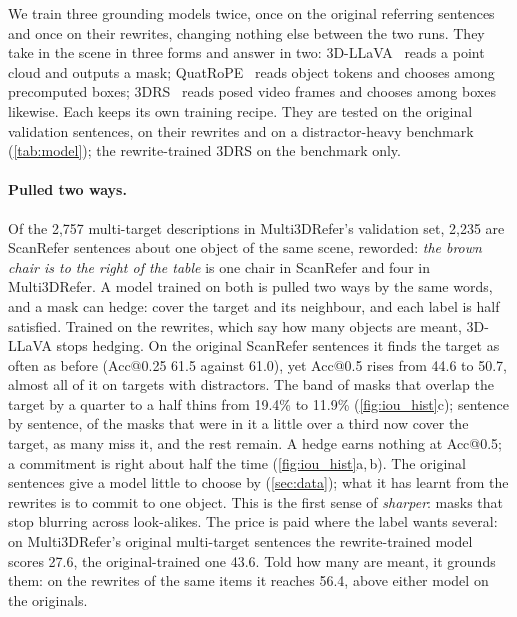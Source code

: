 We train three grounding models twice, once on the original referring sentences and once on their rewrites, changing nothing else between the two runs.
They take in the scene in three forms and answer in two: 3D-LLaVA~\cite{3dllava} reads a point cloud and outputs a mask; QuatRoPE~\cite{quatrope} reads object tokens and chooses among precomputed boxes; 3DRS~\cite{3drs} reads posed video frames and chooses among boxes likewise.
Each keeps its own training recipe.
They are tested on the original validation sentences, on their rewrites and on a distractor-heavy benchmark (\cref{tab:model}); the rewrite-trained 3DRS on the benchmark only.


\paragraph{Pulled two ways.}
Of the 2,757 multi-target descriptions in Multi3DRefer's validation set, 2,235 are ScanRefer sentences about one object of the same scene, reworded: \emph{the brown chair is to the right of the table} is one chair in ScanRefer and four in Multi3DRefer.
A model trained on both is pulled two ways by the same words, and a mask can hedge: cover the target and its neighbour, and each label is half satisfied.
Trained on the rewrites, which say how many objects are meant, 3D-LLaVA stops hedging.
On the original ScanRefer sentences it finds the target as often as before (Acc@0.25 61.5 against 61.0), yet Acc@0.5 rises from 44.6 to 50.7, almost all of it on targets with distractors.
The band of masks that overlap the target by a quarter to a half thins from 19.4\% to 11.9\% (\cref{fig:iou_hist}c); sentence by sentence, of the masks that were in it a little over a third now cover the target, as many miss it, and the rest remain.
A hedge earns nothing at Acc@0.5; a commitment is right about half the time (\cref{fig:iou_hist}a,\,b).
The original sentences give a model little to choose by (\cref{sec:data}); what it has learnt from the rewrites is to commit to one object.
This is the first sense of \emph{sharper}: masks that stop blurring across look-alikes.
The price is paid where the label wants several: on Multi3DRefer's original multi-target sentences the rewrite-trained model scores 27.6, the original-trained one 43.6.
Told how many are meant, it grounds them: on the rewrites of the same items it reaches 56.4, above either model on the originals.


